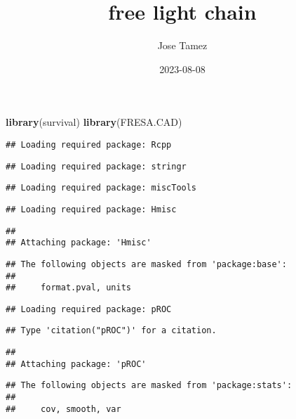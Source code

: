 \documentclass[
]{article}
\title{free light chain}
\author{Jose Tamez}
\date{2023-08-08}
\newenvironment{Shaded}{\begin{snugshade}}{\end{snugshade}}
\newcommand{\FunctionTok}[1]{\textcolor[rgb]{0.13,0.29,0.53}{\textbf{#1}}}
\newcommand{\NormalTok}[1]{#1}
\begin{document}
\maketitle

{
\setcounter{tocdepth}{2}
\tableofcontents
}
\begin{Shaded}
\begin{Highlighting}[]
\FunctionTok{library}\NormalTok{(survival)}
\FunctionTok{library}\NormalTok{(FRESA.CAD)}
\end{Highlighting}
\end{Shaded}

\begin{verbatim}
## Loading required package: Rcpp
\end{verbatim}

\begin{verbatim}
## Loading required package: stringr
\end{verbatim}

\begin{verbatim}
## Loading required package: miscTools
\end{verbatim}

\begin{verbatim}
## Loading required package: Hmisc
\end{verbatim}

\begin{verbatim}
## 
## Attaching package: 'Hmisc'
\end{verbatim}

\begin{verbatim}
## The following objects are masked from 'package:base':
## 
##     format.pval, units
\end{verbatim}

\begin{verbatim}
## Loading required package: pROC
\end{verbatim}

\begin{verbatim}
## Type 'citation("pROC")' for a citation.
\end{verbatim}

\begin{verbatim}
## 
## Attaching package: 'pROC'
\end{verbatim}

\begin{verbatim}
## The following objects are masked from 'package:stats':
## 
##     cov, smooth, var
\end{verbatim}
\end{document}
